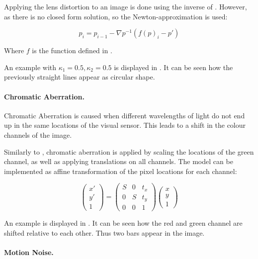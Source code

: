 Applying the lens distortion to an image is done using the inverse of . However, as there is no closed form solution, so the Newton-approximation is used:

\begin{equation}
	p_i = p_{i-1} - \nabla p^{-1} (f(p)_i-p')
\end{equation}

Where $f$ is the function defined in . 

An example with $\kappa_1 = 0.5, \kappa_2 = 0.5$ is displayed in . It can be seen how the previously straight lines appear as circular shape.

\paragraph{Chromatic Aberration.}

Chromatic Aberration is caused when different wavelengths of light do not end up in the same locations of the visual sensor. This leads to a shift in the colour channels of the image.

Similarly to \cite{Carlson2018}, chromatic aberration is applied by scaling the locations of the green channel, as well as applying translations on all channels. The model can be implemented as affine transformation of the pixel locations for each channel:

\begin{equation}
\begin{pmatrix}
x' \\
y' \\
1
\end{pmatrix} = \begin{pmatrix}
S & 0 & t_x \\
0 & S & t_y \\
0 & 0 & 1
\end{pmatrix} \begin{pmatrix}
x \\
y \\
1
\end{pmatrix}
\end{equation}

An example is displayed in . It can be seen how the red and green channel are shifted relative to each other. Thus two bars appear in the image.

\paragraph{Motion Noise.}

